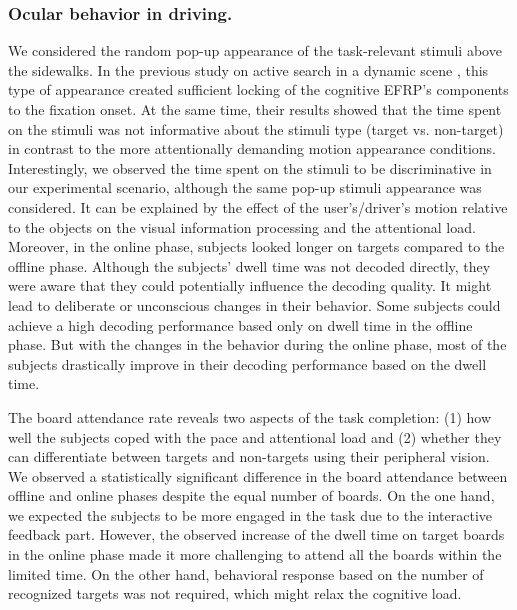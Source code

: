 \documentclass[12pt]{iopart}
\begin{document}
\subsubsection*{Ocular behavior in driving.}
We considered the random pop-up appearance of the task-relevant
stimuli above the sidewalks.  In the previous study
on active search in a dynamic scene \cite{uscumlic_active_2016},
this type of appearance created sufficient locking
of the cognitive EFRP's components to the fixation onset.
At the same time, their results showed that the time spent
on the stimuli was not informative about
the stimuli type (target vs. non-target) in contrast
to the more attentionally demanding motion appearance conditions.   
Interestingly, we observed  the time spent on the stimuli  to be
discriminative in our experimental scenario, although the same
pop-up stimuli appearance was considered.
It can be explained by the effect of the user's/driver's motion relative
to the objects on
the visual information processing and the attentional load.
Moreover, in the online phase,
subjects looked longer on targets compared to the offline phase.
Although the subjects' dwell time was not decoded directly, they were aware
that they could potentially influence the decoding quality. It might
lead to deliberate or unconscious changes in their behavior.
Some subjects could achieve a high decoding performance based
only on dwell time in the offline phase. But with the changes in the behavior
during the online phase, most of the subjects drastically improve in their decoding performance
based on the dwell time.


The board attendance rate reveals two aspects of the task completion:
(1) how well the subjects coped with the pace and attentional load
and (2) whether they can differentiate between targets and non-targets
using their peripheral vision.
We observed a statistically significant difference in the board attendance
between offline and online phases despite the equal number of boards.
On the one hand, we expected the subjects to 
be more engaged in the task due to the interactive feedback part.
However, the observed increase of the dwell time on target boards 
in the online phase made it more challenging to attend all
the boards within the limited time.
On the other hand, behavioral response based on the number of recognized targets
was not required, which might relax the cognitive load.
\end{document}
